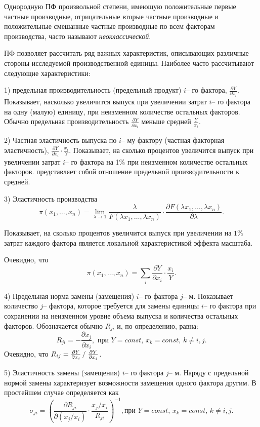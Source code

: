 \documentclass[12pt,openbib]{report}
\begin{document}
Однородную ПФ произвольной степени, имеющую положительные первые
частные производные, отрицательные вторые частные производные и
положительные смешанные частные производные по всем факторам
производства, часто называют {\it неоклассической}.

ПФ позволяет рассчитать ряд важных характеристик, описывающих
различные стороны исследуемой производственной единицы. Наиболее
часто рассчитывают следующие характеристики:

1) предельная производительность (предельный продукт) $i$-- го
фактора, $\frac{\partial Y}{\partial x_i}$. Показывает, насколько
увеличится выпуск при увеличении затрат $i$-- го фактора на одну
(малую) единицу, при неизменном количестве остальных факторов.
Обычно предельная производительность $\frac{\partial Y}{\partial
x_i}$ меньше средней $\frac{ Y}{ x_i}$.

2) Частная эластичность выпуска по $i$-- му фактору (частная
факторная эластичность), $\frac{\partial Y}{\partial
x_i}\cdot\frac{x_i}Y$. Показывает, на сколько процентов увеличится
выпуск при увеличении затрат $i$-- го фактора на 1\% при неизменном
количестве остальных факторов. представляет собой отношение
предельной производительности к средней.

3) Эластичность производства
$$\pi(x_1,\dots,x_n)=\lim_{\lambda\to1}\frac\lambda{F(\lambda
x_1,\dots,\lambda x_n)}\cdot\frac{\partial F(\lambda
x_1,\dots,\lambda x_n)}{\partial\lambda}.$$

Показывает, на сколько процентов увеличится выпуск при увеличении на
$1\%$ затрат каждого фактора является локальной характеристикой
эффекта масштаба.

Очевидно, что $$\pi(x_1,\dots,x_n)=\sum_i\frac{\partial Y}{\partial
x_i}\cdot\frac{x_i}Y.$$

4) Предельная норма замены (замещения) $i$-- го фактора $j$-- м.
Показывает количество $j$-- фактора, которое требуется для замены
единицы $i$-- го фактора при сохранении на неизменном уровне объема
выпуска и количества остальных факторов. Обозначается обычно
$R_{ji}$ и, по определению, равна: $$R_{ji}=-\frac{\partial
x_j}{\partial x_i},\mbox{ при }Y=const,\,x_k=const,\,k\neq i,j.$$
Очевидно, что $R_{ij}=\frac{\partial Y}{\partial
x_i}\left/\right.\frac{\partial Y}{\partial x_j}$.

5) Эластичность замены (замещения) $i$-- го фактора $j$-- м. Наряду
с предельной нормой замены характеризует возможности замещения
одного фактора другим. В простейшем случае определяется как
$$\sigma_{ji}=\left(\frac{\partial
R_{ji}}{\partial(x_j/x_i)}\cdot\frac{x_j/x_i}{R_{ji}}\right)^{-1},\mbox{
при }Y=const,\,x_k=const,\,k\neq i,j.$$
\end{document}

